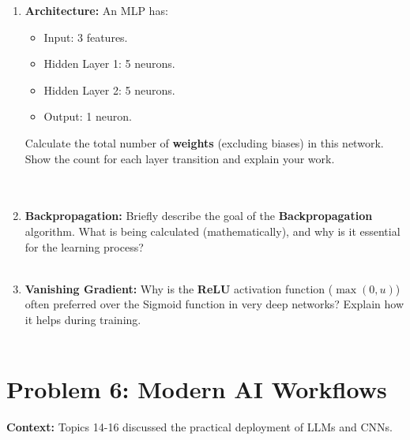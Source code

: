 \documentclass[12pt]{article}
\begin{document}
\begin{enumerate}[label=(\alph*)]
    \item \textbf{Architecture:} An MLP has:
    \begin{itemize}
        \item Input: 3 features.
        \item Hidden Layer 1: 5 neurons.
        \item Hidden Layer 2: 5 neurons.
        \item Output: 1 neuron.
    \end{itemize}
    Calculate the total number of \textbf{weights} (excluding biases) in this network. Show the count for each layer transition and explain your work. \\
    \fullunderline \\
    \fullunderline \\
    \fullunderline

    \item \textbf{Backpropagation:} Briefly describe the goal of the \textbf{Backpropagation} algorithm. What is being calculated (mathematically), and why is it essential for the learning process? \\
    \fullunderline \\
    \fullunderline

    \item \textbf{Vanishing Gradient:} Why is the \textbf{ReLU} activation function ($\max(0, u)$) often preferred over the Sigmoid function in very deep networks? Explain how it helps during training. \\
    \fullunderline \\
    \fullunderline
\end{enumerate}

\section{Problem 6: Modern AI Workflows}
\textbf{Context:} Topics 14-16 discussed the practical deployment of LLMs and CNNs.
\end{document}
